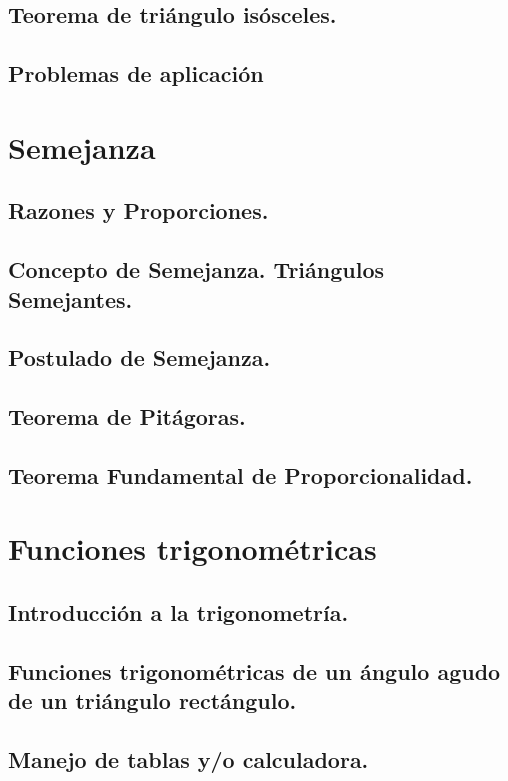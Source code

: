 \subsection{Teorema de triángulo isósceles.}
\subsection{Problemas de aplicación}

\section{Semejanza} %
\subsection{Razones y Proporciones.}
\subsection{Concepto de Semejanza. Triángulos Semejantes.}
\subsection{Postulado de Semejanza.}
\subsection{Teorema de Pitágoras.}
\subsection{Teorema Fundamental de Proporcionalidad. }

\section{Funciones trigonométricas} %

\subsection{Introducción a la trigonometría.}
\subsection{Funciones trigonométricas de un ángulo agudo de un triángulo rectángulo.}
\subsection{Manejo de tablas y/o calculadora.}
